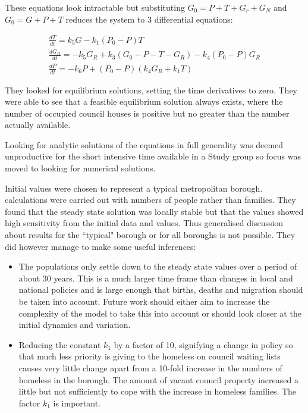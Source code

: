 \documentclass[11pt]{article} %
\begin{document}
These equations look intractable but substituting $ G_0=P+T+G_r+G_N $ and $ G_0=G+P+T$ reduces the system to 3 differential equations:

\begin{eqnarray}
\frac{dT}{dt}=k_5 G -k_1(P_0 -P)T\\
\frac{dG_R}{dt}=-k_5 G_R+k_3(G_0-P-T-G_R)-k_4(P_0-P)G_R\\
\frac{dP}{dt}=-k_6P+(P_0-P)(k_4G_R+k_1T)
\end{eqnarray}
	
	They looked for equilibrium solutions, setting the time derivatives to zero. They were able to see that a feasible equilibrium solution always exists, where the number of occupied council houses is positive but no greater than the number actually available. 
	
	Looking for analytic solutions of the equations in full generality was deemed unproductive for the short intensive time available in a Study group so focus was moved to looking for numerical solutions. 
	
	Initial values were chosen to represent a typical metropolitan borough. calculations were carried out with numbers of people rather than families. They found that the steady state solution was locally stable but that the values showed high sensitivity from the initial data and values. Thus generalised discussion about results for the ``typical" borough or for all boroughs is not possible. They did however manage to make some useful inferences: 
	

	\begin{itemize}
		\item The populations only settle down to the steady state values over a period of about 30 years. This is a much larger time frame than changes in local and national policies and is large enough that births, deaths and migration should be taken into account. Future work should either aim to increase the complexity of the model to take this into account or should look closer at the initial dynamics and variation. 
		\item Reducing the constant $ k_1 $ by a factor of 10, signifying a change in policy so that much less priority is giving to the homeless on council waiting lists causes very little change apart from a 10-fold increase in the numbers of homeless in the borough. The amount of vacant council property increased a little but not sufficiently to cope with the increase in homeless families. The factor $ k_1 $ is important. 
	\end{itemize}
	
\end{document}
